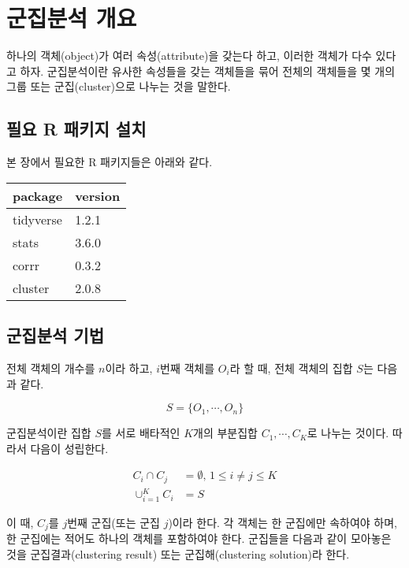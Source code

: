 \documentclass[]{book}
\begin{document}
\hypertarget{clustering-overview}{%
\chapter{군집분석 개요}\label{clustering-overview}}

하나의 객체(object)가 여러 속성(attribute)을 갖는다 하고, 이러한 객체가 다수 있다고 하자. 군집분석이란 유사한 속성들을 갖는 객체들을 묶어 전체의 객체들을 몇 개의 그룹 또는 군집(cluster)으로 나누는 것을 말한다.

\hypertarget{clustering-overview-packages-install}{%
\section{필요 R 패키지 설치}\label{clustering-overview-packages-install}}

본 장에서 필요한 R 패키지들은 아래와 같다.

\begin{tabular}{l|l}
\hline
package & version\\
\hline
tidyverse & 1.2.1\\
\hline
stats & 3.6.0\\
\hline
corrr & 0.3.2\\
\hline
cluster & 2.0.8\\
\hline
\end{tabular}

\hypertarget{clustering-method}{%
\section{군집분석 기법}\label{clustering-method}}

전체 객체의 개수를 \(n\)이라 하고, \(i\)번째 객체를 \(O_i\)라 할 때, 전체 객체의 집합 \(S\)는 다음과 같다.

\begin{equation*}
S = \{O_1, \cdots, O_n\}
\end{equation*}

군집분석이란 집합 \(S\)를 서로 배타적인 \(K\)개의 부분집합 \(C_1, \cdots, C_K\)로 나누는 것이다. 따라서 다음이 성립한다.

\begin{equation*}
\begin{split}
C_i \cap C_j &= \emptyset, \, 1 \leq i \neq j \leq K\\
\cup_{i = 1}^{K} C_i &= S
\end{split}
\end{equation*}

이 때, \(C_j\)를 \(j\)번째 군집(또는 군집 \(j\))이라 한다. 각 객체는 한 군집에만 속하여야 하며, 한 군집에는 적어도 하나의 객체를 포함하여야 한다. 군집들을 다음과 같이 모아놓은 것을 군집결과(clustering result) 또는 군집해(clustering solution)라 한다.
\end{document}
